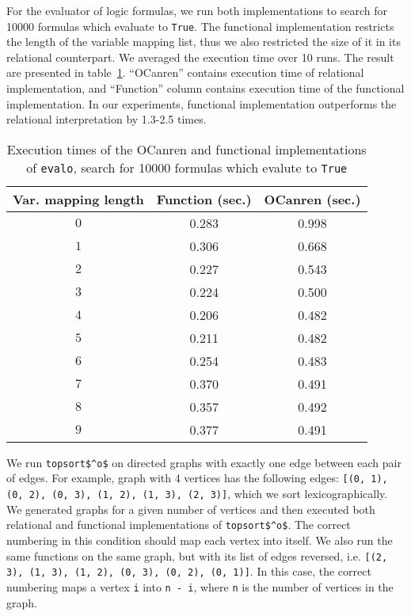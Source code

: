 For the evaluator of logic formulas, we run both implementations to search for 10000 formulas which evaluate to \lstinline{True}.
The functional implementation restricts the length of the variable mapping list, thus we also restricted the size of it in its relational counterpart.
We averaged the execution time over 10 runs.
The result are presented in table~\ref{tbl:prop}.
``OCanren'' contains execution time of relational implementation, and ``Function'' column contains execution time of the functional implementation.
In our experiments, functional implementation outperforms the relational interpretation by 1.3-2.5 times.


\begin{table}
  \caption{Execution times of the OCanren and functional implementations of \lstinline{evalo}, search for 10000 formulas which evalute to \lstinline{True}}
  \label{tbl:prop}
  \begin{tabular}{ccc}
    \toprule
    Var. mapping length&Function (sec.)&OCanren (sec.)\\
    \midrule
    $0$ & 0.283 & 0.998 \\
    $1$ & 0.306 & 0.668 \\
    $2$ & 0.227 & 0.543 \\
    $3$ & 0.224 & 0.500 \\
    $4$ & 0.206 & 0.482 \\
    $5$ & 0.211 & 0.482 \\
    $6$ & 0.254 & 0.483 \\
    $7$ & 0.370 & 0.491 \\
    $8$ & 0.357 & 0.492 \\
    $9$ & 0.377 & 0.491 \\
  \bottomrule
\end{tabular}
\end{table}

We run \lstinline{topsort$^o$} on directed graphs with exactly one edge between each pair of edges.
For example, graph with 4 vertices has the following edges: \lstinline[breaklines=true]{[(0, 1), (0, 2), (0, 3), (1, 2), (1, 3), (2, 3)]}, which we sort lexicographically.
We generated graphs for a given number of vertices and then executed both relational and functional implementations of \lstinline{topsort$^o$}.
The correct numbering in this condition should map each vertex into itself.
We also run the same functions on the same graph, but with its list of edges reversed, i.e. \lstinline[breaklines=true]{[(2, 3), (1, 3), (1, 2), (0, 3), (0, 2), (0, 1)]}.
In this case, the correct numbering maps a vertex \lstinline{i} into \lstinline{n - i}, where \lstinline{n} is the number of vertices in the graph.

